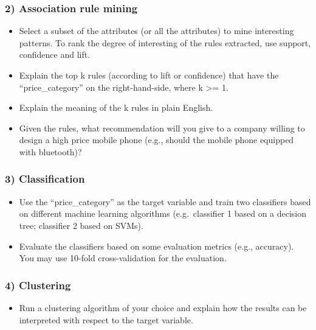 \documentclass[11pt]{article}
\providecommand{\tightlist}{%
      \setlength{\itemsep}{0pt}\setlength{\parskip}{0pt}}
\begin{document}
\hypertarget{association-rule-mining}{%
\subsubsection{2) Association rule
mining}\label{association-rule-mining}}

\begin{itemize}
\tightlist
\item
  Select a subset of the attributes (or all the attributes) to mine
  interesting patterns. To rank the degree of interesting of the rules
  extracted, use support, confidence and lift.
\item
  Explain the top k rules (according to lift or confidence) that have
  the ``price\_category'' on the right-hand-side, where k \textgreater=
  1.
\item
  Explain the meaning of the k rules in plain English.
\item
  Given the rules, what recommendation will you give to a company
  willing to design a high price mobile phone (e.g., should the mobile
  phone equipped with bluetooth)?
\end{itemize}

\hypertarget{classification}{%
\subsubsection{3) Classification}\label{classification}}

\begin{itemize}
\tightlist
\item
  Use the ``price\_category'' as the target variable and train two
  classifiers based on different machine learning algorithms
  (e.g.~classifier 1 based on a decision tree; classifier 2 based on
  SVMs).
\item
  Evaluate the classifiers based on some evaluation metrics (e.g.,
  accuracy). You may use 10-fold cross-validation for the evaluation.
\end{itemize}

\hypertarget{clustering}{%
\subsubsection{4) Clustering}\label{clustering}}

\begin{itemize}
\tightlist
\item
  Run a clustering algorithm of your choice and explain how the results
  can be interpreted with respect to the target variable.
\end{itemize}
\end{document}
